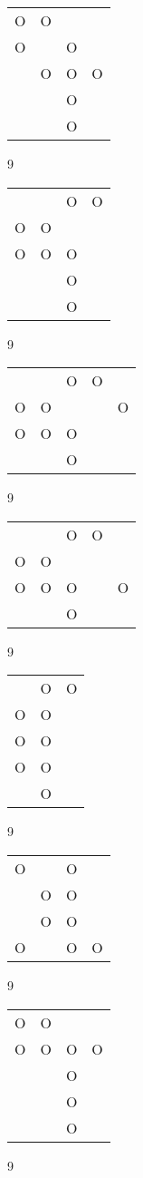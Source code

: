 \begin{tabular}{|m{0.2cm}m{0.2cm}m{0.2cm}m{0.2cm}|}\hline
O&O& & \\
O& &O& \\
 &O&O&O\\
 & &O& \\
 & &O& \\
\hline\end{tabular}9
\begin{tabular}{|m{0.2cm}m{0.2cm}m{0.2cm}m{0.2cm}|}\hline
 & &O&O\\
O&O& & \\
O&O&O& \\
 & &O& \\
 & &O& \\
\hline\end{tabular}9
\begin{tabular}{|m{0.2cm}m{0.2cm}m{0.2cm}m{0.2cm}m{0.2cm}|}\hline
 & &O&O& \\
O&O& & &O\\
O&O&O& & \\
 & &O& & \\
\hline\end{tabular}9
\begin{tabular}{|m{0.2cm}m{0.2cm}m{0.2cm}m{0.2cm}m{0.2cm}|}\hline
 & &O&O& \\
O&O& & & \\
O&O&O& &O\\
 & &O& & \\
\hline\end{tabular}9
\begin{tabular}{|m{0.2cm}m{0.2cm}m{0.2cm}|}\hline
 &O&O\\
O&O& \\
O&O& \\
O&O& \\
 &O& \\
\hline\end{tabular}9
\begin{tabular}{|m{0.2cm}m{0.2cm}m{0.2cm}m{0.2cm}|}\hline
O& &O& \\
 &O&O& \\
 &O&O& \\
O& &O&O\\
\hline\end{tabular}9
\begin{tabular}{|m{0.2cm}m{0.2cm}m{0.2cm}m{0.2cm}|}\hline
O&O& & \\
O&O&O&O\\
 & &O& \\
 & &O& \\
 & &O& \\
\hline\end{tabular}9
